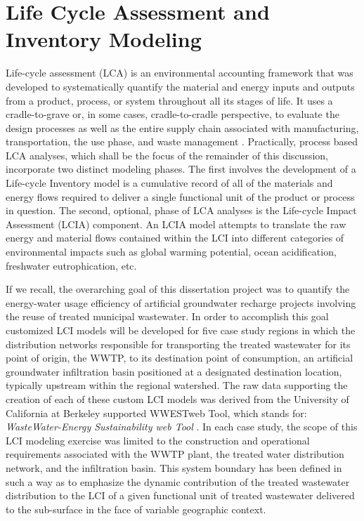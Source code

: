 \section{Life Cycle Assessment and Inventory Modeling}

Life-cycle assessment (LCA) is an environmental accounting framework that was developed to systematically quantify the material and energy inputs and outputs from a product, process, or system throughout all its stages of life. It uses a cradle-to-grave or, in some cases, cradle-to-cradle perspective, to evaluate the design processes as well as the entire supply chain associated with manufacturing, transportation, the use phase, and waste management \cite{Rebitzer2004, Pennington2004}. Practically, process based LCA analyses, which shall be the focus of the remainder of this discussion, incorporate two distinct modeling phases. The first involves the development of a Life-cycle Inventory model is a cumulative record of all of the materials and energy flows required to deliver a single functional unit of the product or process in question. The second, optional, phase of LCA analyses is the Life-cycle Impact Assessment (LCIA) component. An LCIA model attempts to translate the raw energy and material flows contained within the LCI into different categories of environmental impacts such as global warming potential, ocean acidification, freshwater eutrophication, etc. 

If we recall, the overarching goal of this dissertation project was to quantify the energy-water usage efficiency of artificial groundwater recharge projects involving the reuse of treated municipal wastewater. In order to accomplish this goal customized LCI models will be developed for five case study regions in which the distribution networks responsible for transporting the treated wastewater for its point of origin, the WWTP, to its destination point of consumption, an artificial groundwater infiltration basin positioned at a designated destination location, typically upstream within the regional watershed. The raw data supporting the creation of each of these custom LCI models was derived from the University of California at Berkeley supported WWESTweb Tool, which stands for: \textit{WasteWater-Energy Sustainability web Tool} \cite{Stokes2006}. In each case study, the scope of this LCI modeling exercise was limited to the construction and operational requirements associated with the WWTP plant, the treated water distribution network, and the infiltration basin. This system boundary has been defined in such a way as to emphasize the dynamic contribution of the treated wastewater distribution to the LCI of a given functional unit of treated wastewater delivered to the sub-surface in the face of variable geographic context.

